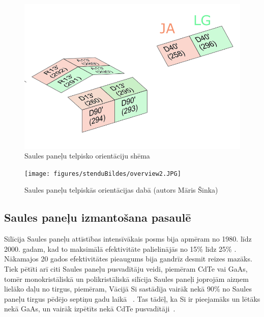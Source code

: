 \begin{figure}[h]
    \centering
    \includegraphics[width=0.7\linewidth]{figures/misc/uzstadijumaShema.jpg}
    \caption{Saules paneļu telpisko orientāciju shēma}
    \label{fig:paneli}
\end{figure}

\begin{figure}[h]
    \centering
    \texttt{[image: figures/stenduBildes/overview2.JPG]}
    \caption{Saules paneļu telpiskās orientācijas dabā (autors Māris Šinka)}
    \label{fig:paneli}
\end{figure}

\subsection{Saules paneļu izmantošana pasaulē}

Silīcija Saules paneļu attīstības intensīvākais posms bija apmēram no 1980. līdz 2000. gadam, kad to maksimālā efektivitāte palielinājās no 15\% līdz 25\%
\cite{Sivaram}. Nākamajos 20 gados efektivitātes pieaugums bija gandrīz desmit reizes mazāks. Tiek pētīti arī citi Saules paneļu pusvadītāju veidi, piemēram CdTe vai GaAs, tomēr monokristāliskā un polikristāliskā silīcija Saules paneļi joprojām aizņem lielāko daļu no tirgus, piemēram, Vācijā Si sastādīja vairāk nekā 90\% no Saules paneļu tirgus pēdējo septiņu gadu laikā ~\cite{prognoze}. Tas tādēļ, ka Si ir pieejamāks un lētāks nekā GaAs\cite{hayes_clemens_2015}, un vairāk izpētīts nekā CdTe pusvadītāji~\cite{Sivaram}.

